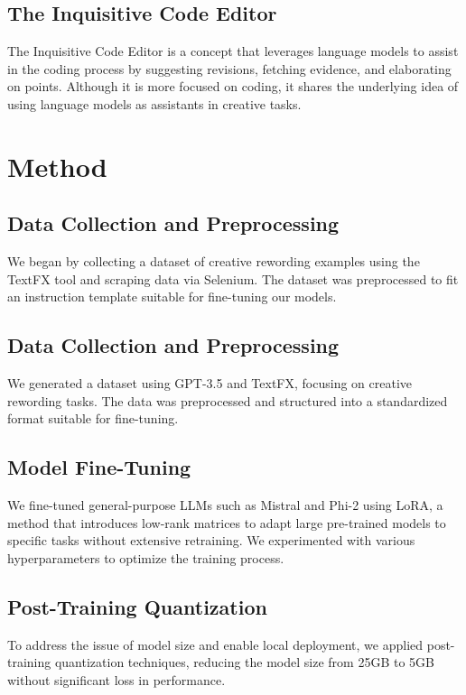 \documentclass{article}
\begin{document}
\subsection{The Inquisitive Code Editor}

The Inquisitive Code Editor is a concept that leverages language models to assist in
the coding process by suggesting revisions, fetching evidence, and elaborating on
points. Although it is more focused on coding, it shares the underlying idea of using
language models as assistants in creative tasks.

\section{Method}
\label{method}

\subsection{Data Collection and Preprocessing}

We began by collecting a dataset of creative rewording examples using the TextFX tool and scraping data via Selenium. The dataset was preprocessed to fit an instruction template suitable for fine-tuning our models.

\subsection{Data Collection and Preprocessing}

We generated a dataset using GPT-3.5 and TextFX, focusing on creative rewording tasks. The data was preprocessed and structured into a standardized format suitable for fine-tuning.

\subsection{Model Fine-Tuning}

We fine-tuned general-purpose LLMs such as Mistral and Phi-2 using LoRA, a method that introduces low-rank matrices to adapt large pre-trained models to specific tasks without extensive retraining. We experimented with various hyperparameters to optimize the training process.

\subsection{Post-Training Quantization}

To address the issue of model size and enable local deployment, we applied post-training quantization techniques, reducing the model size from 25GB to 5GB without significant loss in performance.
\end{document}
